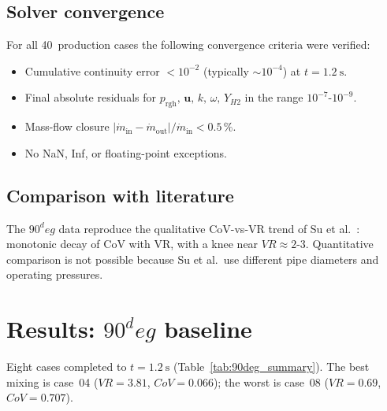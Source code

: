 \documentclass[10pt,a4paper]{article}
\def\Hi{H2}%
\def\VR{VR}%
\def\CoV{CoV}%
\def\circ{ deg}%
\newcommand{\Hi}{\ensuremath{\mathrm{H_2}}}
\newcommand{\VR}{\ensuremath{\mathrm{VR}}}
\newcommand{\CoV}{\ensuremath{\mathrm{CoV}}}
\begin{document}
\subsection{Solver convergence}
For all 40~production cases the following convergence criteria
were verified:
\begin{itemize}
    \item Cumulative continuity error \(<10^{-2}\) (typically
    \(\sim 10^{-4}\)) at \(t=\SI{1.2}{\second}\).
    \item Final absolute residuals for
    \(p_{\mathrm{rgh}},\,\mathbf{u},\,k,\,\omega,\,Y_{\Hi}\)
    in the range \(10^{-7}\)-\(10^{-9}\).
    \item Mass-flow closure
    \(|\dot{m}_{\mathrm{in}}-\dot{m}_{\mathrm{out}}|
    /\dot{m}_{\mathrm{in}} < 0.5\,\%\).
    \item No NaN, Inf, or floating-point exceptions.
\end{itemize}

\subsection{Comparison with literature}
The \(90^\circ\) data reproduce the qualitative \CoV{}-vs-\VR{}
trend of Su et al.~\citep{su2022prediction}: monotonic decay of
\CoV{} with \VR, with a knee near \(\VR\approx 2\)-\(3\).
Quantitative comparison is not possible because Su et al.\ use
different pipe diameters and operating pressures.

\section{\texorpdfstring{Results: $90^\circ$ baseline}{Results: 90 deg baseline}}
\label{sec:results_90}

Eight cases completed to \(t=\SI{1.2}{\second}\)
(Table~\ref{tab:90deg_summary}).  The best mixing is case~04
(\(\VR=3.81\), \(\CoV=0.066\)); the worst is case~08
(\(\VR=0.69\), \(\CoV=0.707\)).
\end{document}
